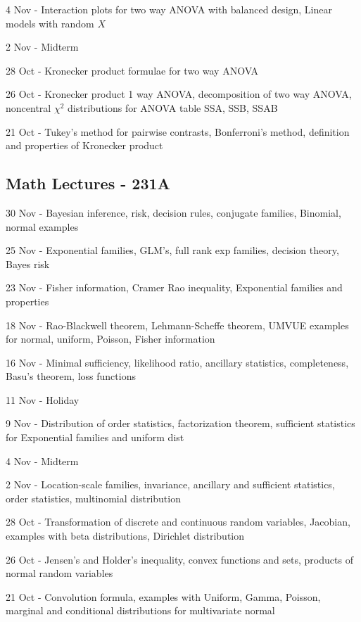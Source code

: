 \documentclass[10pt, twocolumn]{article}
\begin{document}
4 Nov - Interaction plots for two way ANOVA with balanced design, Linear
models with random $X$

2 Nov - Midterm

28 Oct - Kronecker product formulae for two way ANOVA

26 Oct - Kronecker product 1 way ANOVA, decomposition of two way ANOVA,
noncentral $\chi^2$ distributions for ANOVA table SSA, SSB, SSAB

21 Oct - Tukey's method for pairwise contrasts, Bonferroni's method,
definition and properties of Kronecker product

\newpage

\subsection*{Math Lectures - 231A}

30 Nov - Bayesian inference, risk, decision rules, conjugate families,
Binomial, normal examples

25 Nov - Exponential families, GLM's, full rank exp families, decision
theory, Bayes risk

23 Nov - Fisher information, Cramer Rao inequality, Exponential families
and properties

18 Nov - Rao-Blackwell theorem, Lehmann-Scheffe theorem, UMVUE examples for
normal, uniform, Poisson, Fisher information

16 Nov - Minimal sufficiency, likelihood ratio, ancillary statistics,
completeness, Basu's theorem, loss functions

11 Nov - Holiday

9 Nov - Distribution of order statistics, factorization theorem, sufficient
statistics for Exponential families and uniform dist

4 Nov - Midterm

2 Nov - Location-scale families, invariance, ancillary and sufficient
statistics, order statistics, multinomial distribution

28 Oct - Transformation of discrete and continuous random variables,
Jacobian, examples with beta distributions, Dirichlet distribution

26 Oct - Jensen's and Holder's inequality, convex functions and sets,
products of normal random variables

21 Oct - Convolution formula, examples with Uniform, Gamma, Poisson,
marginal and conditional distributions for multivariate normal
\newpage
\end{document}
